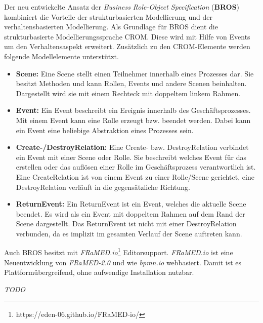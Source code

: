 Der neu entwickelte Ansatz der \emph{Business Role-Object Specification} (\textbf{BROS}) kombiniert die Vorteile der strukturbasierten Modellierung und der verhaltensbasierten Modellierung.
Als Grundlage für BROS dient die strukturbasierte Modellierungssprache  CROM.
Diese wird mit Hilfe von Events um den Verhaltensaspekt erweitert.
Zusätzlich zu den CROM-Elemente werden folgende Modellelemente unterstützt.

\begin{itemize}
    \item \textbf{Scene:}
    Eine Scene stellt einen Teilnehmer innerhalb eines Prozesses dar.
    Sie besitzt Methoden und kann Rollen, Events und andere Scenen beinhalten.
    Dargestellt wird sie mit einem Rechteck mit doppeltem linkem Rahmen.
    \item \textbf{Event:}
    Ein Event beschreibt ein Ereignis innerhalb des Geschäftsprozesses.
    Mit einem Event kann eine Rolle erzeugt bzw. beendet werden.
    Dabei kann ein Event eine beliebige Abstraktion eines Prozesses sein.
    \item \textbf{Create-/DestroyRelation:}
    Eine Create- bzw. DestroyRelation verbindet ein Event mit einer Scene oder Rolle.
    Sie beschreibt welches Event für das erstellen oder das auflösen einer Rolle im Geschäftsprozess verantwortlich ist.
    Eine CreateRelation ist von einem Event zu einer Rolle/Scene gerichtet, eine DestroyRelation verläuft in die gegensätzliche Richtung.
    \item \textbf{ReturnEvent:}
    Ein ReturnEvent ist ein Event, welches die aktuelle Scene beendet.
    Es wird als ein Event mit doppeltem Rahmen auf dem Rand der Scene dargestellt.
    Das ReturnEvent ist nicht mit einer DestroyRelation verbunden, da es implizit im gesamten Verlauf der Scene auftreten kann.
\end{itemize}

Auch BROS besitzt mit \emph{FRaMED.io}\footnote{https://eden-06.github.io/FRaMED-io/} Editorsupport.
\emph{FRaMED.io} ist eine Neuentwicklung von \emph{FRaMED-2.0} und wie \emph{bpmn.io} webbasiert.
Damit ist es Plattformübergreifend, ohne aufwendige Installation nutzbar.

\textit{TODO}

